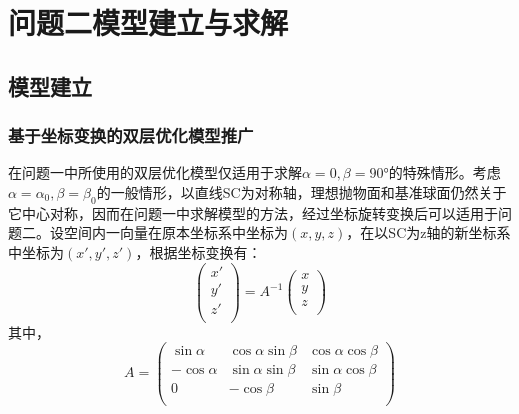 \documentclass[withoutpreface,bwprint,fontset=macnew]{cumcmthesis} %
\begin{document}
	\section {问题二模型建立与求解}
	\subsection{模型建立}
	\subsubsection {基于坐标变换的双层优化模型推广}
		
		
		在问题一中所使用的双层优化模型仅适用于求解$\alpha =0, \beta = 90°$的特殊情形。考虑$\alpha = \alpha_0, \beta = \beta_0$的一般情形，以直线SC为对称轴，理想抛物面和基准球面仍然关于它中心对称，因而在问题一中求解模型的方法，经过坐标旋转变换后可以适用于问题二。设空间内一向量在原本坐标系中坐标为$(x,y,z)$，在以SC为z轴的新坐标系中坐标为$(x', y', z')$，根据坐标变换有：
		\begin{equation*}
			\begin{pmatrix}
			    x' \\
			    y' \\
			    z' \\
			\end{pmatrix}=
			A^{-1}
			\begin{pmatrix}
			    x \\
			    y \\
			    z \\
			\end{pmatrix}
			\label{eq:coordinate_transform}
		\end{equation*}
		其中，$$A = \begin{pmatrix}
						    \sin\alpha & \cos\alpha\sin\beta & \cos\alpha\cos\beta \\
						    -\cos\alpha & \sin\alpha\sin\beta & \sin\alpha\cos\beta \\
						    0 & -\cos\beta & \sin\beta \\
						\end{pmatrix}$$
		
\end{document}
